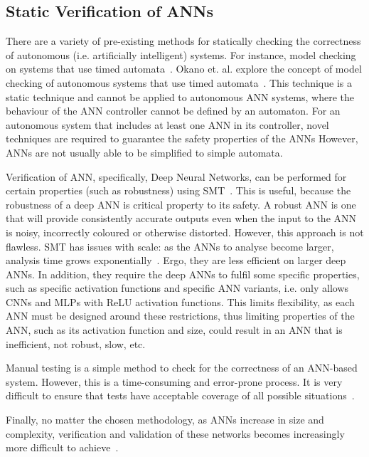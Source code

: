 \subsection{Static Verification of \acp{ANN}}
There are a variety of pre-existing methods for statically checking the correctness of autonomous (i.e. artificially intelligent) systems.
For instance, model checking on systems that use timed automata~\cite{timed-enf-autonomous}.
Okano et. al. explore the concept of model checking of autonomous systems that use timed automata~\cite{timed-enf-autonomous}. 
This technique is a static technique and cannot be applied to autonomous \ac{ANN} systems, where the behaviour of the \ac{ANN} controller cannot be defined by an automaton.
For an autonomous system that includes at least one \ac{ANN} in its controller, novel techniques are required to guarantee the safety properties of the \acp{ANN}
However, \acp{ANN} are not usually able to be simplified to simple automata.

Verification of \ac{ANN}, specifically, Deep Neural Networks, can be performed for certain properties (such as robustness) using \ac{SMT}~\cite{Gehr2018AI2SA,reluplex,DeepANNverify}.
This is useful, because the robustness of a deep \ac{ANN} is critical property to its safety.
A robust \ac{ANN} is one that will provide consistently accurate outputs even when the input to the \ac{ANN} is noisy, incorrectly coloured or otherwise distorted. 
However, this approach is not flawless. 
\ac{SMT} has issues with scale: as the \acp{ANN} to analyse become larger, analysis time grows exponentially~\cite{Gehr2018AI2SA}.
Ergo, they are less efficient on larger deep \acp{ANN}.
In addition, they require the deep \acp{ANN} to fulfil some specific properties, such as specific activation functions and specific \ac{ANN} variants, i.e. \cite{Gehr2018AI2SA} only allows \acp{CNN} and \acp{MLP} with \ac{ReLU} activation functions.
This limits flexibility, as each \ac{ANN} must be designed around these restrictions, thus limiting properties of the \ac{ANN}, such as its activation function and size, could result in an \ac{ANN} that is inefficient, not robust, slow, etc.

Manual testing is a simple method to check for the correctness of an \ac{ANN}-based system. 
However, this is a time-consuming and error-prone process.
It is very difficult to ensure that tests have acceptable coverage of all possible situations~\cite{ANN-test}.

Finally, no matter the chosen methodology, as \acp{ANN} increase in size and complexity, verification and validation of these networks becomes increasingly more difficult to achieve~\cite{Gehr2018AI2SA}.




